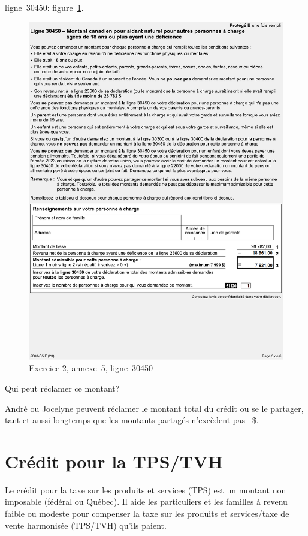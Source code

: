ligne~30450:
figure~\ref{fig:chap4Exercice2Q11}.
\begin{figure}
	\centering
	\includegraphics[width=.9\textwidth]{exercice/4-2/Q11/30450.png}
	\caption[]{Exercice 2, annexe~5, ligne~30450}
	\label{fig:chap4Exercice2Q11}
\end{figure}

\begin{sousQuestion}
	Qui peut réclamer ce montant?
\end{sousQuestion}
André ou Jocelyne peuvent réclamer le montant total du crédit ou se le partager, tant et aussi longtemps que les montants partagés n'excèdent pas ~\$.



\section{Crédit pour la TPS/TVH}
\begin{intro}
	Le crédit pour la taxe sur les produits et services (TPS) est un montant non imposable (fédéral ou Québec). Il aide les particuliers et les familles à revenu faible ou modeste pour compenser la taxe sur les produits et services/taxe de vente harmonisée (TPS/TVH) qu'ils paient.
\end{intro}

